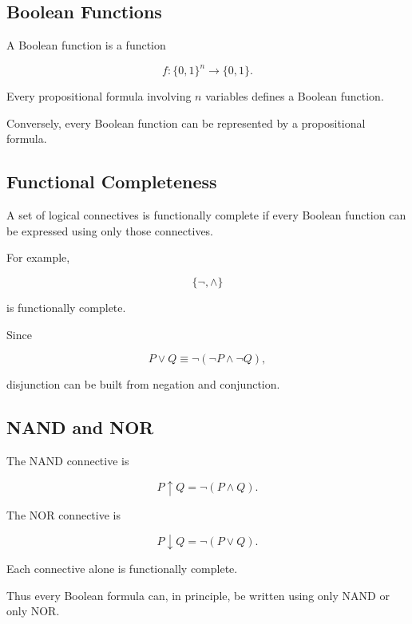 \subsection{Boolean Functions}
\label{subsec:boolean-functions-formal-logic}

A Boolean function is a function

\[
\boxed{
f:
\{0,1\}^n
\rightarrow
\{0,1\}.
}
\]

Every propositional formula involving \(n\) variables defines a Boolean
function.

Conversely, every Boolean function can be represented by a propositional
formula.

\subsection{Functional Completeness}
\label{subsec:functional-completeness}

A set of logical connectives is functionally complete if every Boolean
function can be expressed using only those connectives.

For example,

\[
\boxed{
\{\neg,\land\}
}
\]

is functionally complete.

Since

\[
P\lor Q
\equiv
\neg(\neg P\land\neg Q),
\]

disjunction can be built from negation and conjunction.

\subsection{NAND and NOR}
\label{subsec:nand-nor}

The NAND connective is

\[
\boxed{
P\uparrow Q
=
\neg(P\land Q).
}
\]

The NOR connective is

\[
\boxed{
P\downarrow Q
=
\neg(P\lor Q).
}
\]

Each connective alone is functionally complete.

Thus every Boolean formula can, in principle, be written using only NAND
or only NOR.

